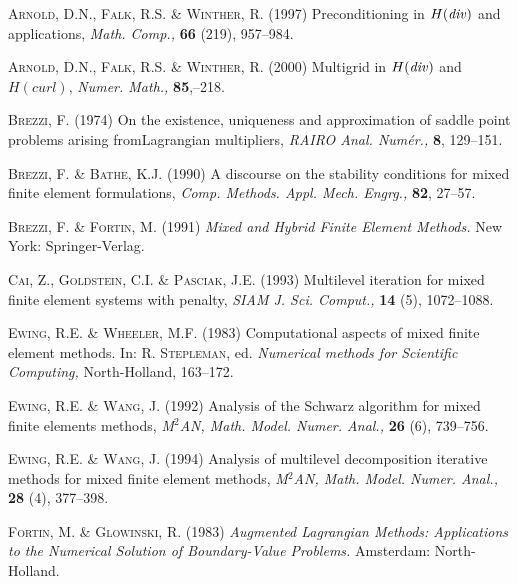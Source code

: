 \documentclass{imamci}
\numberwithin{equation}{section}
\begin{document}
\begin{references}

\item{}
\textsc{Arnold, D.N., Falk, R.S. \& Winther, R.} (1997)   Preconditioning
in $H({\it div})$ and applications,   {\em Math. Comp.,}   \textbf{66}
(219), 957--984.

\item{}
\textsc{Arnold, D.N., Falk, R.S. \& Winther, R.} (2000)   Multigrid
in $H({\it div})$ and $H(curl)$, {\em Numer. Math.,}   \textbf{85},--218.

\item{}
\textsc{Brezzi, F.} (1974)  {On the existence, uniqueness and approximation
of saddle point problems arising from\break Lagrangian multipliers,}
 {\em RAIRO Anal. Num\'er.,} \textbf{8}, 129--151.

\item{}
\textsc{Brezzi, F. \& Bathe, K.J.} (1990)  {A discourse on the stability
conditions for mixed finite element formulations},  {\em Comp. Methods.
Appl. Mech. Engrg.,}   \textbf{82}, 27--57.

\item{}
\textsc{Brezzi, F. \& Fortin, M.} (1991)  {\em Mixed and Hybrid Finite
Element Methods.}   New York: Springer-Verlag.

\item{}
\textsc{Cai, Z., Goldstein, C.I. \& Pasciak, J.E.} (1993)  {Multilevel
iteration for mixed finite element systems with penalty},  {\em SIAM
J. Sci. Comput.,}   \textbf{14} (5), 1072--1088.

\item{}
\textsc{Ewing, R.E. \& Wheeler, M.F.} (1983)  {Computational aspects
of mixed finite element methods.}  {In: \textsc{R. Stepleman,} ed.
 \em Numerical methods for Scientific Computing,} North-Holland, 163--172.

\item{}
\textsc{Ewing, R.E. \& Wang, J.} (1992)  {Analysis of the Schwarz
algorithm for mixed finite elements methods},  {\em M$^2$AN, Math.
Model. Numer. Anal.,}   \textbf{26} (6), 739--756.

\item{}
\textsc{Ewing, R.E. \& Wang, J.} (1994)  {Analysis of multilevel
decomposition iterative methods for mixed finite element methods},  {\em M$^2$AN, Math. Model. Numer. Anal.,}   \textbf{28} (4), 377--398.


\item{}
\textsc{Fortin, M. \& Glowinski, R.} (1983)  {\em Augmented Lagrangian
Methods: Applications to the Numerical Solution of Boundary-Value Problems.}
Amsterdam: North-Holland.


\end{references}
\end{document}

